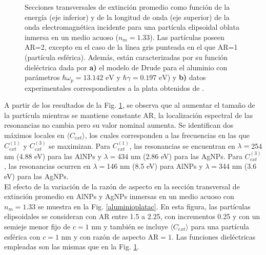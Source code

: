 \begin{figure}[h!]
	\quad%
	\caption{Secciones transversales de extinción promedio como función de la energía (eje inferior) y de la longitud de onda (eje superior) de la onda electromagnética incidente para una partícula elipsoidal oblata inmersa en un medio acuoso ($n_m=1.33$). Las partículas poseen AR=2, excepto en el caso de la línea gris punteada en el que AR=1 (partícula esférica). Además, están caracterizadas por su función dieléctrica dada por  \textbf{a)} el modelo de Drude para el aluminio con parámetros $\hbar\omega_p=13.142\text{ eV}$ y $\hbar\gamma=0.197\text{ eV}$) y \textbf{b)} datos experimentales correspondientes a la plata obtenidos de \cite{Plata}. }\label{aluminioplataAR}
\end{figure}
A partir de los resultados de la Fig. \ref{aluminioplataAR}, se observa que al aumentar el tamaño de la partícula mientras se mantiene constante AR, la localización espectral de las resonancias no cambia pero su valor nominal aumenta. Se identifican dos máximos locales en $\langle C_{ext}\rangle$,  los cuales corresponden a las frecuencias en las que $C_{ext}^{(1)}$ y $C_{ext}^{(3)}$ se maximizan. Para $C_{ext}^{(1)}$, las resonancias  se encuentran en $\lambda=$254 nm (4.88 eV) para las AlNPs y $\lambda=$434 nm (2.86 eV) para las AgNPs. Para $C_{ext}^{(3)}$, las resonancias ocurren en $\lambda=$146 nm (8.5 eV) para AlNPs y $\lambda=$344 nm (3.6 eV) para las AgNPs. \\

El efecto de la variación de la razón de aspecto en la sección transversal de extinción promedio en AlNPs y AgNPs inmersas en un medio acuoso con $n_m=1.33$ se muestra en la Fig. \ref{aluminioplatac}. En esta figura, las partículas elipsoidales se consideran con AR entre 1.5 a 2.25, con incrementos 0.25 y con un semieje menor fijo de $c=1\text{ nm}$ y también se incluye $\langle C_{ext}\rangle$ para una partícula esférica con  $c=1\text{ nm}$ y con razón de aspecto AR$=1$. Las funciones dieléctricas empleadas son las mismas que en la Fig. \ref{aluminioplataAR}.


